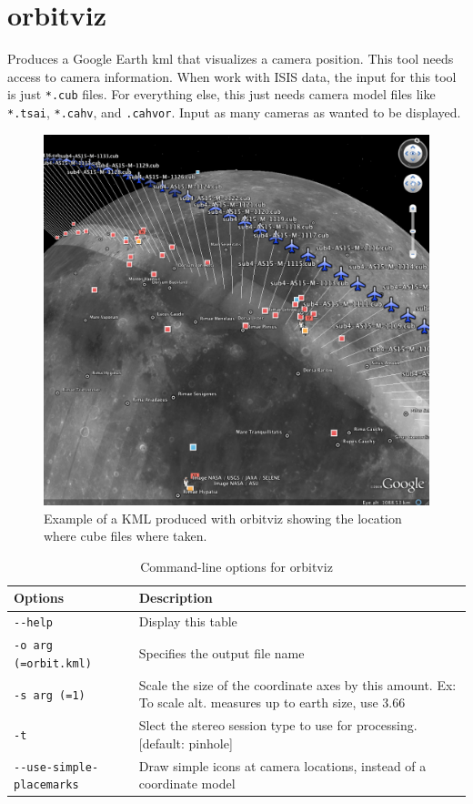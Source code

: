 \section{orbitviz}
\label{orbitviz}

Produces a Google Earth kml that visualizes a camera position. This
tool needs access to camera information. When work with ISIS data, the
input for this tool is just \verb#*.cub# files. For everything else,
this just needs camera model files like \verb#*.tsai#, \verb#*.cahv#,
and \verb#.cahvor#. Input as many cameras as wanted to be displayed.

\begin{figure}[h]
  \begin{center}
  \includegraphics[width=6in]{images/orbitviz_ge_result.png}
  \end{center}
  \caption{ Example of a KML produced with orbitviz showing the location where cube files where taken. }
  \label{fig:orbitviz_example}
\end{figure}

\begin{longtable}{|l|p{10cm}|}
\caption{Command-line options for orbitviz}
\label{tbl:orbitviz}
\endfirsthead
\endhead
\endfoot
\endlastfoot
\hline
Options & Description \\ \hline \hline
\verb#--help# & Display this table \\ \hline
\verb#-o arg (=orbit.kml)# & Specifies the output file name \\ \hline
\verb#-s arg (=1)# & Scale the size of the coordinate axes by this amount. Ex: To scale alt. measures up to earth size, use 3.66 \\ \hline
\verb#-t# & Slect the stereo session type to use for processing. [default: pinhole] \\ \hline
\verb#--use-simple-placemarks# & Draw simple icons at camera locations, instead of a coordinate model \\ \hline
\end{longtable}

